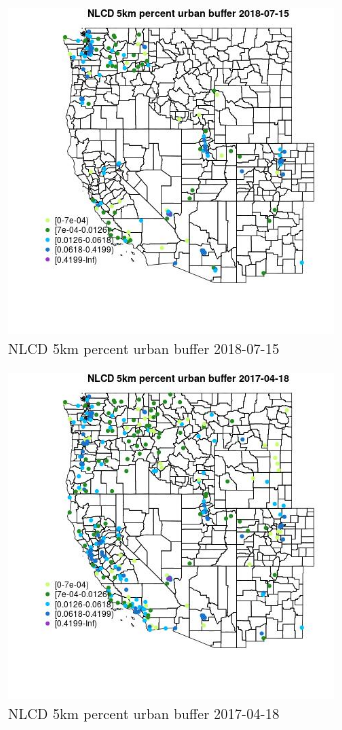 \begin{figure} 
\centering  
\includegraphics[width=0.77\textwidth]{Code_Outputs/Report_ML_input_PM25_Step4_part_e_de_duplicated_aves_compiled_2019-05-21wNAs_MapObsNLCD_5km_percent_urban_buffer2018-07-15.jpg} 
\caption{\label{fig:Report_ML_input_PM25_Step4_part_e_de_duplicated_aves_compiled_2019-05-21wNAsMapObsNLCD_5km_percent_urban_buffer2018-07-15}NLCD 5km percent urban buffer 2018-07-15} 
\end{figure} 
 

\begin{figure} 
\centering  
\includegraphics[width=0.77\textwidth]{Code_Outputs/Report_ML_input_PM25_Step4_part_e_de_duplicated_aves_compiled_2019-05-21wNAs_MapObsNLCD_5km_percent_urban_buffer2017-04-18.jpg} 
\caption{\label{fig:Report_ML_input_PM25_Step4_part_e_de_duplicated_aves_compiled_2019-05-21wNAsMapObsNLCD_5km_percent_urban_buffer2017-04-18}NLCD 5km percent urban buffer 2017-04-18} 
\end{figure} 
 


